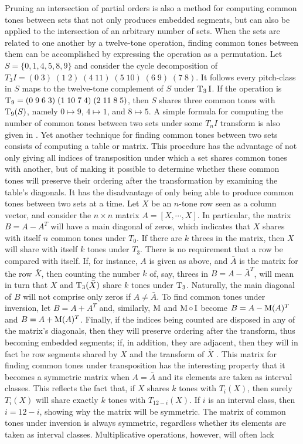 Pruning an intersection of partial orders is also a method for computing common tones between sets that not only produces embedded segments, but can also be applied to the intersection of an arbitrary number of sets. When the sets are related to one another by a twelve-tone operation, finding common tones between them can be accomplished by expressing the operation as a permutation. Let $S = \{ 0, 1, 4, 5, 8, 9 \}$ and consider the cycle decomposition of $T_3I = (0 \; 3) \; (1 \; 2) \; (4 \; 11) \; (5 \; 10) \; (6 \; 9) \; (7 \; 8)$. It follows every pitch-class in $S$ maps to the twelve-tone complement of $S$ under $\operatorname{T}_3\operatorname{I}$. If the operation is $\operatorname{T}_9 = (0 \; 9 \; 6 \; 3) \; (1 \; 10 \; 7 \; 4) \; (2 \; 11 \; 8 \; 5)$, then $S$ shares three common tones with $\operatorname{T}_9(S)$, namely $0 \mapsto 9$, $4 \mapsto 1$, and $8 \mapsto 5$. A simple formula for computing the number of common tones between two sets under some $T_nI$ transform is also given in \cite[10]{Rahn1975}. Yet another technique for finding common tones between two sets consists of computing a table or matrix. This procedure has the advantage of not only giving all indices of transposition under which a set shares common tones with another, but of making it possible to determine whether these common tones will preserve their ordering after the transformation by examining the table's diagonals. It has the disadvantage of only being able to produce common tones between two sets at a time. Let $X$ be an $n$-tone row seen as a column vector, and consider the $n \times n$ matrix $A = [X, \cdots, X]$. In particular, the matrix $B = A - A^T$ will have a main diagonal of zeros, which indicates that $X$ shares with itself $n$ common tones under $T_0$. If there are $k$ threes in the matrix, then $X$ will share with itself $k$ tones under $T_3$. There is no requirement that a row be compared with itself. If, for instance, $A$ is given as above, and $\bar{A}$ is the matrix for the row $\bar{X}$, then counting the number $k$ of, say, threes in $B = A - \bar{A}^T$, will mean in turn that $X$ and $\operatorname{T}_3(\bar{X})$ share $k$ tones under $\operatorname{T}_3$. Naturally, the main diagonal of $B$ will not comprise only zeros if $A \ne \bar{A}$. To find common tones under inversion, let $B = A + A^T$ and, similarly, $\operatorname{M}$ and $\operatorname{M} \circ \operatorname{I}$ become $B = A - \operatorname{M}(A)^T$ and $B = A + \operatorname{M}(A)^T$. Finally, if the indices being counted are disposed in any of the matrix's diagonals, then they will preserve ordering after the transform, thus becoming embedded segments; if, in addition, they are adjacent, then they will in fact be row segments shared by $X$ and the transform of $\bar{X}$ \cite[49]{Morris1987}. This matrix for finding common tones under transposition has the interesting property that it becomes a symmetric matrix when $A = \bar{A}$ and its elements are taken as interval classes. This reflects the fact that, if $X$ shares $k$ tones with $T_i(X)$, then surely $T_i(X)$ will share exactly $k$ tones with $T_{12 - i}(X)$. If $i$ is an interval class, then $i = 12 - i$, showing why the matrix will be symmetric. The matrix of common tones under inversion is always symmetric, regardless whether its elements are taken as interval classes. Multiplicative operations, however, will often lack 